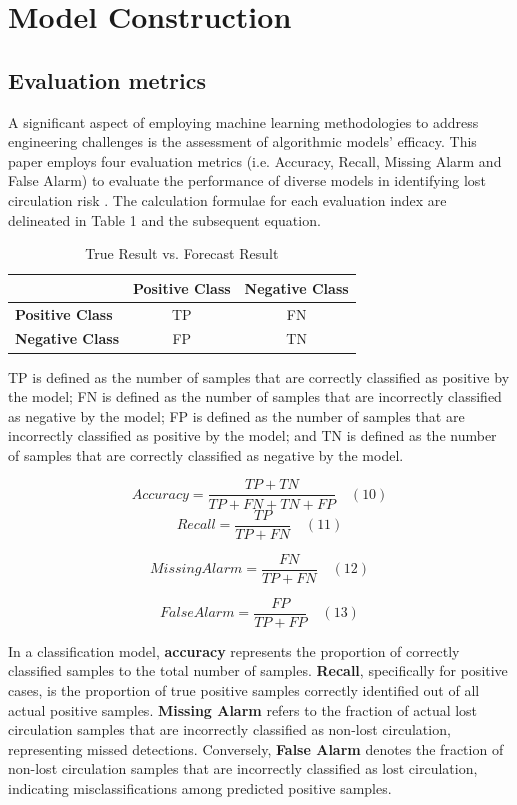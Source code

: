 \documentclass[journal,article,submit,pdftex,moreauthors]{Definitions/mdpi}
\begin{document}
\section{Model Construction}
\subsection{Evaluation metrics}

A significant aspect of employing machine learning methodologies to address engineering challenges is the assessment of algorithmic models' efficacy. This paper employs four evaluation metrics (i.e. Accuracy, Recall, Missing Alarm and False Alarm\cite{SunW2023}) to evaluate the performance of diverse models in identifying lost circulation risk \cite{ZZY2024}. The calculation formulae for each evaluation index are delineated in Table 1 and the subsequent equation.

\begin{table}[h]
\centering
\begin{tabular}{lcc}
\hline
                      & \textbf{Positive Class} & \textbf{Negative Class} \\ \hline
\textbf{Positive Class} & TP                      & FN                      \\
\textbf{Negative Class} & FP                      & TN                      \\ \hline
\end{tabular}
\caption{True Result vs. Forecast Result}
\label{True Result vs. Forecast Result}
\end{table}
TP is defined as the number of samples that are correctly classified as positive by the model;
FN is defined as the number of samples that are incorrectly classified as negative by the model;
FP is defined as the number of samples that are incorrectly classified as positive by the model; and
TN is defined as the number of samples that are correctly classified as negative by the model.

$$ A c c u r a c y = \frac { T P + T N } { T P + F N + T N + F P }\quad (10)$$
$$ R e c a l l = \frac { T P } { T P + F N } \quad (11)$$

$$ M i s sin g A l a r m = \frac { F N } { T P + F N } \quad (12)$$

$$ F a l s e A l a r m = \frac { F P } { T P + F P } \quad (13)$$

In a classification model, \textbf{accuracy} represents the proportion of correctly classified samples to the total number of samples. \textbf{Recall}, specifically for positive cases, is the proportion of true positive samples correctly identified out of all actual positive samples. \textbf{Missing Alarm} refers to the fraction of actual lost circulation samples that are incorrectly classified as non-lost circulation, representing missed detections. Conversely, \textbf{False Alarm} denotes the fraction of non-lost circulation samples that are incorrectly classified as lost circulation, indicating misclassifications among predicted positive samples.
\end{document}
